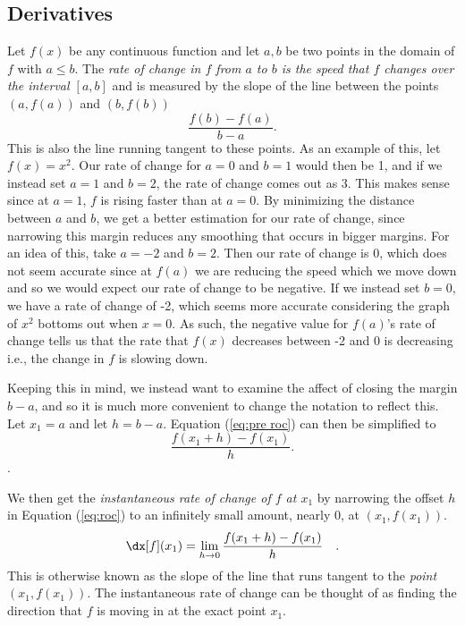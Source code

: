 \subsection{Derivatives}

Let $f(x)$ be any continuous function and let $a, b$ be two points in the domain of $f$ with $a\leq b$. The \emph{rate of change in $f$ from $a$ to $b$ is the speed that $f$ changes over the interval $[a,b]$} and is measured by the slope of the line between
the points $(a, f(a))$ and $(b, f(b))$
\begin{equation}\label{eq:pre roc}
    \frac{f(b)-f(a)}{b-a}.
\end{equation}
This is also the line running tangent to these points.
As an example of this, let $f(x)=x^2$. Our rate of change for $a=0$ and $b=1$ would then be 1, and if we instead set $a=1$ and $b=2$, the rate of change comes out as 3. This makes sense since at $a=1$, $f$ is rising faster than at $a=0$. By minimizing the distance between $a$ and $b$, we get a better estimation for our rate of change, since narrowing this margin reduces any smoothing that occurs in bigger margins. For an idea of this, take $a=-2$ and $b=2$. Then our rate of change is $0$, which does not seem accurate since at $f(a)$ we are reducing the speed which we move down and so we would expect our rate of change to be negative. If we instead set $b=0$, we have a rate of change of -2, which seems more accurate considering the graph of $x^2$ bottoms out when $x=0$. As such, the negative value for $f(a)$'s rate of change tells us that the rate that $f(x)$ decreases between -2 and 0 is decreasing i.e., the change in $f$ is slowing down.

Keeping this in mind, we instead want to examine the affect of closing the margin $b-a$, and so it is much more convenient to change the notation to reflect this. Let $x_1 = a$ and let $h = b - a$. Equation (\ref{eq:pre roc}) can then be simplified to
\begin{equation}\label{eq:roc}
    \frac{f(x_1+h)-f(x_1)}{h}.
\end{equation}.

We then get the \emph{instantaneous rate of change of $f$ at $x_1$} by
narrowing the offset $h$ in Equation (\ref{eq:roc}) to an infinitely small
amount, nearly 0, at $(x_1, f(x_1))$.
\begin{equation}\label{eq:iroc}
    \dx[f] (x_1) = \lim_{h\rightarrow 0} \frac{f(x_1 + h) - f(x_1)}{h} \quad .
\end{equation}
This is otherwise known as the slope of the line that runs tangent to the \emph{point} $(x_1,f(x_1))$. The instantaneous rate of change can be thought of as finding the direction that $f$ is moving in at the exact point $x_1$.

